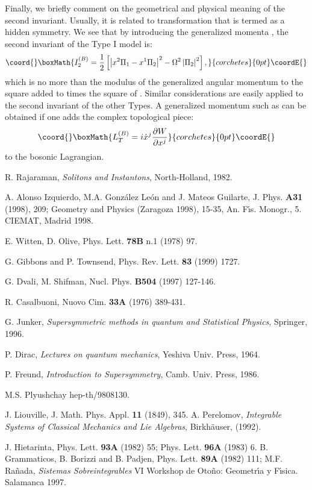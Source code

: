 \documentclass[a4paper,11pt,twoside]{article}
\begin{document}
Finally, we briefly comment on the geometrical and physical
meaning of the second invariant. Usually, it is related to
transformation that is termed as a hidden symmetry. We see that by
introducing the generalized momenta \coordHE{}, the second invariant of
the Type I model is:
\[\coord{}\boxMath{
I_2^{(B)}=\frac{1}{2} \left[ \left| x^2\Pi_1-x^1\Pi_2
\right|^2-\Omega^2 \left| \Pi_2 \right|^2 \right],
}{corchetes}{0pt}\coordE{}\]
which is no more than the modulus of the generalized angular
momentum to the square added to \coordHE{} times the square of
\coordHE{}. Similar considerations are easily applied to the second
invariant of the other Types. A generalized momentum such as
\coordHE{} can be obtained if one adds the complex topological piece:
\[\coord{}\boxMath{
L_T^{(B)}=i{\dot x}^j\frac{\partial W}{\partial x^j}
}{corchetes}{0pt}\coordE{}\]
to the bosonic Lagrangian.
\begin{thebibliography}{99}

 \sc R. Rajaraman, {\em Solitons and Instantons}, \rm North-Holland, 1982.

 \sc A. Alonso Izquierdo, M.A. Gonz\'alez Le\'on and J. Mateos Guilarte, \rm J. Phys. {\bf A31} (1998), 209; \rm Geometry and Physics (Zaragoza 1998), 15-35, An. F\'{\i}s. Monogr., 5. CIEMAT, Madrid 1998.

 \sc E. Witten, D. Olive, \rm Phys. Lett. {\bf 78B} n.1 (1978) 97.

 \sc G. Gibbons and P. Townsend, \rm Phys. Rev. Lett. {\bf 83} (1999) 1727.

 \sc G. Dvali, M. Shifman, \rm Nucl. Phys. {\bf B504} (1997) 127-146.

 \sc R. Casalbuoni, \rm Nuovo Cim. {\bf 33A} (1976) 389-431.

 \sc G. Junker, {\em Supersymmetric methods in quantum and Statistical Physics}, \rm Springer, 1996.

 \sc P. Dirac, {\em Lectures on quantum mechanics}, \rm Yeshiva Univ. Press, 1964.

 \sc P. Freund, {\em Introduction to Supersymmetry}, \rm Camb. Univ. Press, 1986.

 \sc M.S. Plyushchay \rm hep-th/9808130.

 \sc J. Liouville, \rm J. Math. Phys. Appl. {\bf 11} (1849), 345. \sc A. Perelomov, {\em Integrable Systems of Classical
Mechanics and Lie Algebras}, \rm Birkh\"auser, (1992).

 \sc J. Hietarinta, \rm Phys. Lett. {\bf 93A} (1982) 55; \rm Phys. Lett. {\bf 96A} (1983) 6. \sc B. Grammaticos, B. Borizzi and B. Padjen, \rm Phys. Lett. {\bf 89A} (1982) 111; \sc M.F. Ra\~nada, {\em Sistemas Sobreintegrables} \rm VI Workshop de Oto\~no: Geometr\'{\i}a y F\'{\i}sica. Salamanca 1997.

\end{thebibliography}
\end{document}
